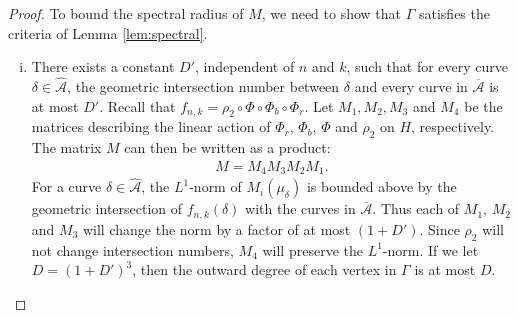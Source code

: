 \begin{proof}

To bound the spectral radius of $M$, we need to show that $\Gamma$ satisfies
the criteria of Lemma \ref{lem:spectral}.


\begin{enumerate}[(i)]
\item There exists a constant $D'$, independent of $n$ and
  $k$, such that for every curve $\delta \in \widehat{\mathcal{A}}$, the geometric
  intersection number between $\delta$ and every curve in $\overline{\mathcal{A}}$ is at most $D'$. %
  Recall that $f_{n,k}=\rho_2\circ\Phi\circ\Phi_b\circ\Phi_r$.  Let $M_1,M_2,M_3$ and $M_4$ be the matrices describing the linear action of $\Phi_r,\,\Phi_b,\,\Phi$ and $\rho_2$ on $H$, respectively. The matrix
  $M$ can then be written as a product:
  \begin{align*}
    M = M_4M_3M_2M_1.
  \end{align*}
  For a curve $\delta \in \widehat{\mathcal{A}}$, the $L^1$-norm of $M_i(\mu_\delta)$ is bounded above by the geometric intersection of
  $f_{n,k}(\delta)$ with the curves in $\overline{\mathcal{A}}$.  Thus each of $M_1$, $M_2$ and $M_3$ will change the norm by
  a factor of at most $(1 + D')$. Since $\rho_2$ will not change intersection numbers, $M_4$ will preserve the
  $L^1$-norm. If we let $D = (1 + D')^3$, then the outward degree of each vertex in $\Gamma$ is at most $D$.
  

\end{enumerate}
\end{proof}
